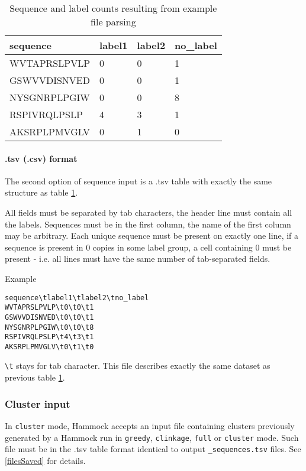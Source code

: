 \documentclass[11pt, a4paper, twoside, titlepage]{article}
\begin{document}
\begin{table}[h]
\begin{tabular}{|l|l|l|l|}
\hline
sequence     & label1 & label2 & no\_label \\ \hline
WVTAPRSLPVLP & 0      & 0      & 1         \\
GSWVVDISNVED & 0      & 0      & 1         \\
NYSGNRPLPGIW & 0      & 0      & 8         \\
RSPIVRQLPSLP & 4      & 3      & 1         \\
AKSRPLPMVGLV & 0      & 1      & 0         \\ \hline
\end{tabular}
\label{tab1}
\caption{Sequence and label counts resulting from example file parsing}
\end{table}


\paragraph{.tsv (.csv) format}
The second option of sequence input is a .tsv table with exactly the same structure as table \ref{tab1}.

All fields must be separated by tab characters, the header line must contain all the labels. Sequences must be in the first column, the name of the first column may be arbitrary. Each unique sequence must be present on exactly one line, if a sequence is present in 0 copies in some label group, a cell containing 0 must be present - i.e. all lines must have the same number of tab-separated fields. \newline

Example

\begin{verbatim}
sequence\tlabel1\tlabel2\tno_label
WVTAPRSLPVLP\t0\t0\t1
GSWVVDISNVED\t0\t0\t1
NYSGNRPLPGIW\t0\t0\t8
RSPIVRQLPSLP\t4\t3\t1
AKSRPLPMVGLV\t0\t1\t0
\end{verbatim}

\texttt{\textbackslash t} stays for tab character.
This file describes exactly the same dataset as previous table \ref{tab1}.

\subsubsection{Cluster input}
In \texttt{cluster} mode, Hammock accepts an input file containing clusters previously generated by a Hammock run in \texttt{greedy}, \texttt{clinkage}, \texttt{full} or \texttt{cluster} mode. Such file must be in the .tsv table format identical to output \texttt{\_sequences.tsv} files. See \ref{filesSaved} for details.
\end{document}
